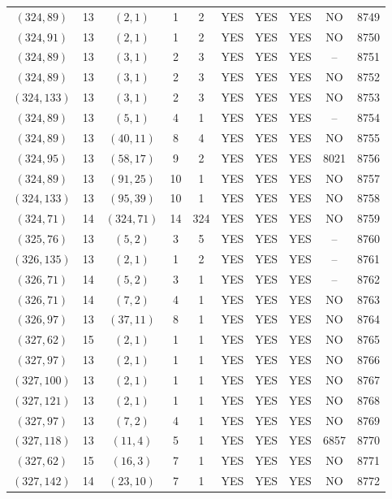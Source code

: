 \begin{longtable}{|c|c|c|c|c|c|c|c|c|c|}
$(324, 89)$ & 13 & $(2, 1)$ & 1 & 2 & YES & YES & YES & NO & 8749\\
$(324, 91)$ & 13 & $(2, 1)$ & 1 & 2 & YES & YES & YES & NO & 8750\\
$(324, 89)$ & 13 & $(3, 1)$ & 2 & 3 & YES & YES & YES & -- & 8751\\
$(324, 89)$ & 13 & $(3, 1)$ & 2 & 3 & YES & YES & YES & NO & 8752\\
$(324, 133)$ & 13 & $(3, 1)$ & 2 & 3 & YES & YES & YES & NO & 8753\\
$(324, 89)$ & 13 & $(5, 1)$ & 4 & 1 & YES & YES & YES & -- & 8754\\
$(324, 89)$ & 13 & $(40, 11)$ & 8 & 4 & YES & YES & YES & NO & 8755\\
$(324, 95)$ & 13 & $(58, 17)$ & 9 & 2 & YES & YES & YES & 8021 & 8756\\
$(324, 89)$ & 13 & $(91, 25)$ & 10 & 1 & YES & YES & YES & NO & 8757\\
$(324, 133)$ & 13 & $(95, 39)$ & 10 & 1 & YES & YES & YES & NO & 8758\\
$(324, 71)$ & 14 & $(324, 71)$ & 14 & 324 & YES & YES & YES & NO & 8759\\
$(325, 76)$ & 13 & $(5, 2)$ & 3 & 5 & YES & YES & YES & -- & 8760\\
$(326, 135)$ & 13 & $(2, 1)$ & 1 & 2 & YES & YES & YES & -- & 8761\\
$(326, 71)$ & 14 & $(5, 2)$ & 3 & 1 & YES & YES & YES & -- & 8762\\
$(326, 71)$ & 14 & $(7, 2)$ & 4 & 1 & YES & YES & YES & NO & 8763\\
$(326, 97)$ & 13 & $(37, 11)$ & 8 & 1 & YES & YES & YES & NO & 8764\\
$(327, 62)$ & 15 & $(2, 1)$ & 1 & 1 & YES & YES & YES & NO & 8765\\
$(327, 97)$ & 13 & $(2, 1)$ & 1 & 1 & YES & YES & YES & NO & 8766\\
$(327, 100)$ & 13 & $(2, 1)$ & 1 & 1 & YES & YES & YES & NO & 8767\\
$(327, 121)$ & 13 & $(2, 1)$ & 1 & 1 & YES & YES & YES & NO & 8768\\
$(327, 97)$ & 13 & $(7, 2)$ & 4 & 1 & YES & YES & YES & NO & 8769\\
$(327, 118)$ & 13 & $(11, 4)$ & 5 & 1 & YES & YES & YES & 6857 & 8770\\
$(327, 62)$ & 15 & $(16, 3)$ & 7 & 1 & YES & YES & YES & NO & 8771\\
$(327, 142)$ & 14 & $(23, 10)$ & 7 & 1 & YES & YES & YES & NO & 8772\\

\end{longtable}
